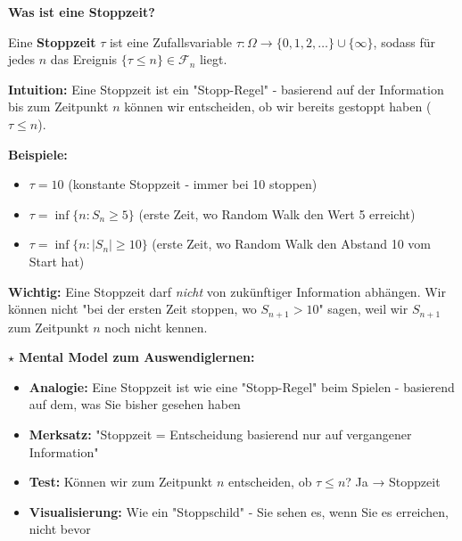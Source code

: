 \begin{denoobification}[Stoppzeit]
\textbf{Was ist eine Stoppzeit?}

Eine \textbf{Stoppzeit} $\tau$ ist eine Zufallsvariable $\tau: \Omega \to \{0, 1, 2, \ldots\} \cup \{\infty\}$, sodass für jedes $n$ das Ereignis $\{\tau \leq n\} \in \mathcal{F}_n$ liegt.

\textbf{Intuition:} Eine Stoppzeit ist ein "Stopp-Regel" - basierend auf der Information bis zum Zeitpunkt $n$ können wir entscheiden, ob wir bereits gestoppt haben ($\tau \leq n$).

\textbf{Beispiele:}
\begin{itemize}
    \item $\tau = 10$ (konstante Stoppzeit - immer bei 10 stoppen)
    \item $\tau = \inf\{n : S_n \geq 5\}$ (erste Zeit, wo Random Walk den Wert 5 erreicht)
    \item $\tau = \inf\{n : |S_n| \geq 10\}$ (erste Zeit, wo Random Walk den Abstand 10 vom Start hat)
\end{itemize}

\textbf{Wichtig:} Eine Stoppzeit darf \textit{nicht} von zukünftiger Information abhängen. Wir können nicht "bei der ersten Zeit stoppen, wo $S_{n+1} > 10$" sagen, weil wir $S_{n+1}$ zum Zeitpunkt $n$ noch nicht kennen.

\textbf{$\star$ Mental Model zum Auswendiglernen:}
\begin{itemize}
    \item \textbf{Analogie:} Eine Stoppzeit ist wie eine "Stopp-Regel" beim Spielen - basierend auf dem, was Sie bisher gesehen haben
    \item \textbf{Merksatz:} "Stoppzeit = Entscheidung basierend nur auf vergangener Information"
    \item \textbf{Test:} Können wir zum Zeitpunkt $n$ entscheiden, ob $\tau \leq n$? Ja → Stoppzeit
    \item \textbf{Visualisierung:} Wie ein "Stoppschild" - Sie sehen es, wenn Sie es erreichen, nicht bevor
\end{itemize}

\begin{center}
\end{center}
\end{denoobification}
